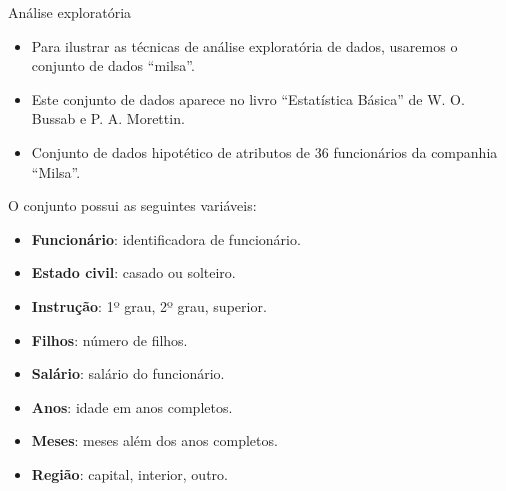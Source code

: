 \documentclass[
  ignorenonframetext,
  serif,
  professionalfont,
  usenames,
  dvipsnames,
  aspectratio = 169]{beamer}
\providecommand{\tightlist}{%
  \setlength{\itemsep}{0pt}\setlength{\parskip}{0pt}}
\renewcommand{\tightlist}{%
  \setlength{\itemsep}{0\baselineskip}
  \setlength{\parskip}{0.25\baselineskip}
}
\def\beginAHalfColumn{\begin{minipage}{0.49\textwidth}}%
\def\endColumns{\end{minipage}}%
\begin{document}
\begin{frame}{Análise exploratória}
\label{anuxe1lise-exploratuxf3ria-7}
\beginAHalfColumn

\begin{itemize}
\tightlist
\item
  Para ilustrar as técnicas de análise exploratória de dados, usaremos o
  conjunto de dados ``milsa''.
\end{itemize}

\vspace{0.3cm}

\begin{itemize}
\tightlist
\item
  Este conjunto de dados aparece no livro ``Estatística Básica'' de W.
  O. Bussab e P. A. Morettin.
\end{itemize}

\vspace{0.3cm}

\begin{itemize}
\tightlist
\item
  Conjunto de dados hipotético de atributos de 36 funcionários da
  companhia ``Milsa''.
\end{itemize}

\endColumns
\beginAHalfColumn

O conjunto possui as seguintes variáveis:

\begin{itemize}
\tightlist
\item
  \textbf{Funcionário}: identificadora de funcionário.
\item
  \textbf{Estado civil}: casado ou solteiro.
\item
  \textbf{Instrução}: 1º grau, 2º grau, superior.
\item
  \textbf{Filhos}: número de filhos.
\item
  \textbf{Salário}: salário do funcionário.
\item
  \textbf{Anos}: idade em anos completos.
\item
  \textbf{Meses}: meses além dos anos completos.
\item
  \textbf{Região}: capital, interior, outro.
\end{itemize}

\endColumns
\end{frame}
\end{document}

